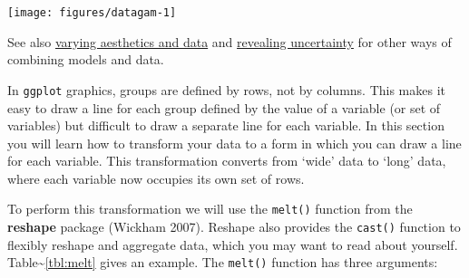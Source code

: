 \begin{Shaded}
\begin{Highlighting}[]
\NormalTok{>}\StringTok{ }\StringTok{ }\StringTok{ } \NormalTok{) +}\StringTok{ } 
\NormalTok{>}\StringTok{ }\StringTok{ }\NormalTok{(}
\NormalTok{+}\StringTok{   } \NormalTok{(}\NormalTok{, }\NormalTok{, } \NormalTok{),}
\NormalTok{+}\StringTok{   } 
\NormalTok{+}\StringTok{ }\NormalTok{))}
\NormalTok{>}\StringTok{ }\StringTok{ }
\NormalTok{>}\StringTok{ }   \NormalTok{)}
\end{Highlighting}
\end{Shaded}

\begin{flushleft}\texttt{[image: figures/datagam-1]} \end{flushleft}

See also \hyperref[sub:different-aesthetics]{varying aesthetics and
data} and \hyperref[sec:uncertainty]{revealing uncertainty} for other
ways of combining models and data.


In \texttt{ggplot} graphics, groups are defined by rows, not by columns.
This makes it easy to draw a line for each group defined by the value of
a variable (or set of variables) but difficult to draw a separate line
for each variable. In this section you will learn how to transform your
data to a form in which you can draw a line for each variable. This
transformation converts from `wide' data to `long' data, where each
variable now occupies its own set of rows. 

To perform this transformation we will use the \texttt{melt()} function
from the \textbf{reshape} package (Wickham 2007). Reshape also provides
the \texttt{cast()} function to flexibly reshape and aggregate data,
which you may want to read about yourself.
Table\textasciitilde{}\ref{tbl:melt} gives an example. The
\texttt{melt()} function has three arguments: 

